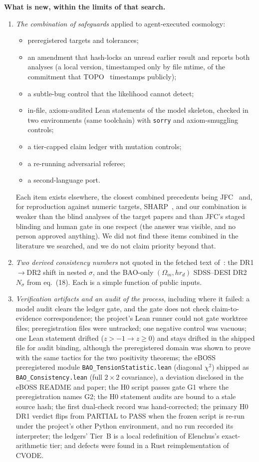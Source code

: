 \documentclass[11pt]{article}
\begin{document}
\textbf{What is new, within the limits of that search.}
\begin{enumerate}
\item \emph{The combination of safeguards} applied to agent-executed cosmology:
  \begin{itemize}
  \item preregistered targets and tolerances;
  \item an amendment that hash-locks an unread earlier result and reports both analyses (a local version, timestamped only by file mtime, of the commitment that TOPO~\cite{topo2024} timestamps publicly);
  \item a subtle-bug control that the likelihood cannot detect;
  \item in-file, axiom-audited Lean statements of the model skeleton, checked in two environments (same toolchain) with \texttt{sorry} and axiom-smuggling controls;
  \item a tier-capped claim ledger with mutation controls;
  \item a re-running adversarial referee;
  \item a second-language port.
  \end{itemize}
  Each item exists elsewhere, the closest combined precedents being JFC~\cite{moreno2026} and, for reproduction against numeric targets, SHARP~\cite{sharp2026}, and our combination is weaker than the blind analyses of the target papers and than
  JFC's staged blinding and human gate in one respect (the answer was visible, and no person approved anything).
  We did not find these items combined in the literature we searched, and we do not claim priority beyond that.
\item \emph{Two derived consistency numbers} not quoted in the fetched text of~\cite{desi2025dr2,desi2024vi}: the DR1$\to$DR2 shift in
nested $\sigma$, and the BAO-only $(\Omega_m, hr_d)$ SDSS--DESI DR2 $N_\sigma$ from eq.~(18). Each is a simple function of public inputs.
\item \emph{Verification artifacts and an audit of the process}, including where it failed: a model audit clears the ledger gate, and the gate does
not check claim-to-evidence correspondence; the project's Lean runner could not gate worktree files; preregistration files were untracked; one
negative control was vacuous; one Lean statement drifted ($z>-1\to z\ge0$) and stays drifted in the shipped file for audit binding, although the preregistered domain
was shown to prove with the same tactics for the two positivity theorems; the eBOSS preregistered module
\texttt{BAO\_TensionStatistic.lean} (diagonal $\chi^2$) shipped as \texttt{BAO\_Consistency.lean} (full $2\times2$ covariance), a deviation disclosed in
the eBOSS README and paper; the H0 script passes gate G1 where the preregistration names G2; the H0 statement audits are bound to a stale source hash;
the first dual-check record was hand-corrected; the primary H0 DR1 verdict flips from PARTIAL to PASS when the frozen script is re-run under the project's other
Python environment, and no run recorded its interpreter; the ledgers' Tier~B is a local redefinition of Elenchus's exact-arithmetic tier; and defects were found in a
Rust reimplementation of CVODE.
\end{enumerate}
\end{document}
